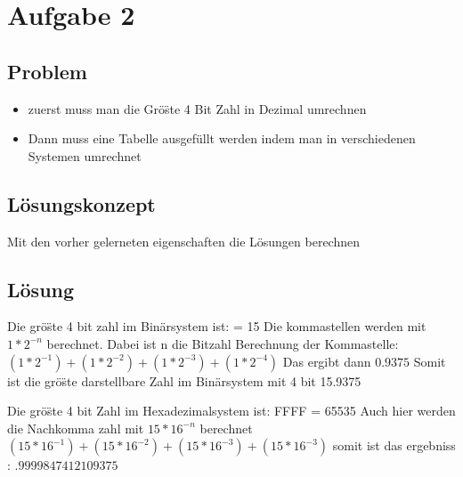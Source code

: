 \documentclass[a4paper,11pt,titlepage]{article}
\begin{document}
\section{Aufgabe 2}
\subsection{Problem}
\begin {itemize}
\item zuerst muss man die Gr\"o\"ste 4 Bit Zahl in Dezimal umrechnen \newline
\item Dann muss eine Tabelle ausgefüllt werden indem man in verschiedenen Systemen umrechnet \newline
\end {itemize}

\subsection{L\"osungskonzept}
Mit den vorher gelerneten eigenschaften die L\"osungen berechnen \newline

\pagebreak
\subsection{L\"osung}
Die gr\"o\"ste 4 bit zahl im Bin\"arsystem ist:  = 15 \newline
Die kommastellen werden mit $1*2^{-n}$ berechnet. Dabei ist n die Bitzahl \newline
Berechnung der Kommastelle: \newline
$(1*2^{-1}) + (1*2^{-2}) + (1*2^{-3})+ (1*2^{-4})$ \newline
Das ergibt dann $0.9375$ \newline
Somit ist die gr\"o\"ste darstellbare Zahl im Bin\"arsystem mit 4 bit 15.9375 \newline


Die gr\"o\"ste 4 bit Zahl im Hexadezimalsystem ist: \newline
FFFF = 65535 \newline
Auch hier werden die Nachkomma zahl mit $15*16^{-n}$ berechnet \newline
$(15 * 16^{-1}) + (15 * 16^{-2}) + (15 * 16^{-3}) + (15 * 16^{-3})$ \newline
somit ist das ergebniss : $.9999847412109375$ \newline
\end{document}
